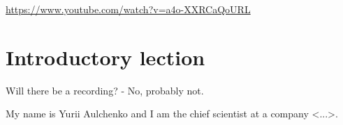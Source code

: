 \documentclass[main.tex]{subfiles}
\begin{document}
\url{https://www.youtube.com/watch?v=a4o-XXRCaQoURL}

\section{ Introductory lection }

Will there be a recording? - No, probably not.

My name is Yurii Aulchenko and I am the chief scientist at a company <...>.
\end{document}
